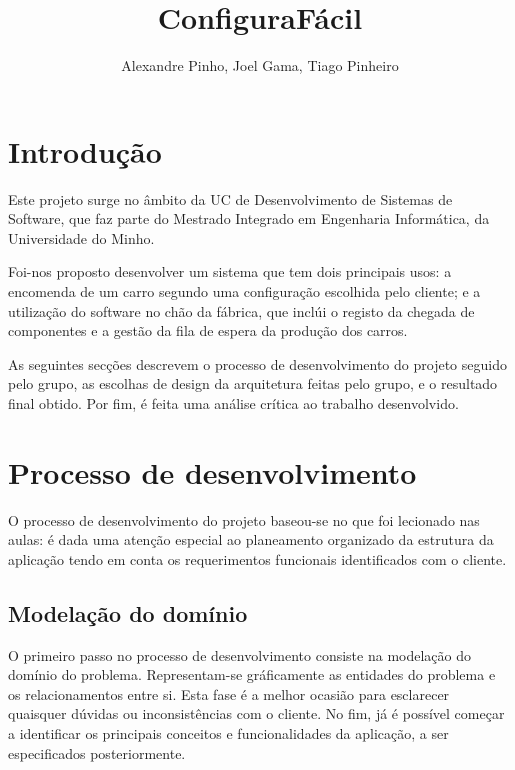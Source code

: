 \documentclass{llncs}
\newcommand\tab[1][0.5cm]{\hspace*{#1}}
\begin{document}
\title{ConfiguraFácil}
\author{Alexandre Pinho, Joel Gama, Tiago Pinheiro}


\maketitle

\clearpage

\section{Introdução}

Este projeto surge no âmbito da UC de Desenvolvimento de Sistemas de Software, que faz parte do Mestrado Integrado em Engenharia Informática, da Universidade do Minho.

\tab Foi-nos proposto desenvolver um sistema que tem dois principais usos: a encomenda de um carro segundo uma configuração escolhida pelo cliente; e a utilização do software no chão da fábrica, que inclúi o registo da chegada de componentes e a gestão da fila de espera da produção dos carros. 

\tab As seguintes secções descrevem o processo de desenvolvimento do projeto seguido pelo grupo, as escolhas de design da arquitetura feitas pelo grupo, e o resultado final obtido. Por fim, é feita uma análise crítica ao trabalho desenvolvido.

\clearpage
\section{Processo de desenvolvimento}

\tab O processo de desenvolvimento do projeto baseou-se no que foi lecionado nas aulas: é dada uma atenção especial ao planeamento organizado da estrutura da aplicação tendo em conta os requerimentos funcionais identificados com o cliente.

\subsection{Modelação do domínio}

O primeiro passo no processo de desenvolvimento consiste na modelação do domínio do problema. Representam-se gráficamente as entidades do problema e os relacionamentos entre si. Esta fase é a melhor ocasião para esclarecer quaisquer dúvidas ou inconsistências com o cliente. No fim, já é possível começar a identificar os principais conceitos e funcionalidades da aplicação, a ser especificados posteriormente.
\end{document}
